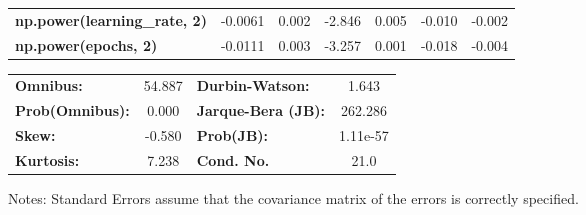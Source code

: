 \begin{center}
\begin{tabular}{lcccccc}
\textbf{np.power(learning\_rate, 2)} &      -0.0061  &        0.002     &    -2.846  &         0.005        &       -0.010    &       -0.002     \\
\textbf{np.power(epochs, 2)}         &      -0.0111  &        0.003     &    -3.257  &         0.001        &       -0.018    &       -0.004     \\
\bottomrule
\end{tabular}
\begin{tabular}{lclc}
\textbf{Omnibus:}       & 54.887 & \textbf{  Durbin-Watson:     } &    1.643  \\
\textbf{Prob(Omnibus):} &  0.000 & \textbf{  Jarque-Bera (JB):  } &  262.286  \\
\textbf{Skew:}          & -0.580 & \textbf{  Prob(JB):          } & 1.11e-57  \\
\textbf{Kurtosis:}      &  7.238 & \textbf{  Cond. No.          } &     21.0  \\
\bottomrule
\end{tabular}
\end{center}

Notes: \newline
 [1] Standard Errors assume that the covariance matrix of the errors is correctly specified.